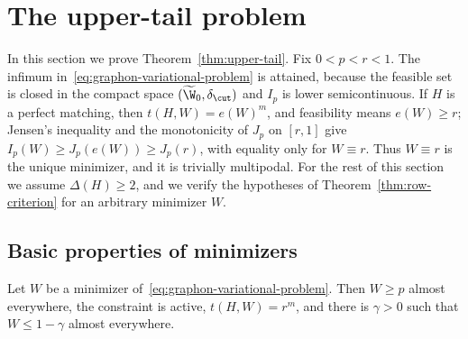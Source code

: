 \section{The upper-tail problem}\label{sec:upper-tail}

In this section we prove Theorem~\ref{thm:upper-tail}.  Fix $0<p<r<1$.  The
infimum in~\eqref{eq:graphon-variational-problem} is attained, because the
feasible set is closed in the compact space $(\widetilde\W_0,\delta_\cut)$ and
$I_p$ is lower semicontinuous.  If $H$ is a perfect matching, then
$t(H,W)=e(W)^m$, and feasibility means $e(W)\ge r$; Jensen's inequality and the
monotonicity of $J_p$ on $[r,1]$ give $I_p(W)\ge J_p(e(W))\ge J_p(r)$, with
equality only for $W\equiv r$.  Thus $W\equiv r$ is the unique minimizer, and
it is trivially multipodal.  For the rest of this section we assume
$\Delta(H)\ge2$, and we verify the hypotheses of
Theorem~\ref{thm:row-criterion} for an arbitrary minimizer $W$.

\subsection{Basic properties of minimizers}

\begin{lemma}\label{lem:upper-tail-basic}
Let $W$ be a minimizer of~\eqref{eq:graphon-variational-problem}.  Then
$W\ge p$ almost everywhere, the constraint is active, $t(H,W)=r^m$, and there is
$\gamma>0$ such that $W\le1-\gamma$ almost everywhere.
\end{lemma}

